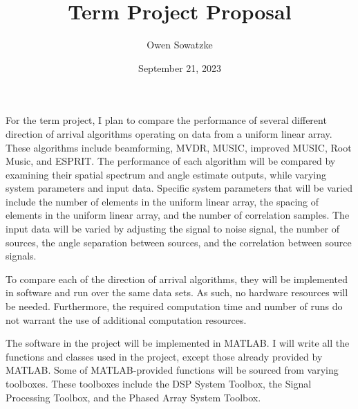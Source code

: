 \documentclass{article}
\title{Term Project Proposal}
\author{Owen Sowatzke}
\date{September 21, 2023}
\begin{document}
	\maketitle

	For the term project, I plan to compare the performance of several different direction of arrival algorithms operating on data from a uniform linear array. These algorithms include beamforming, MVDR, MUSIC, improved MUSIC, Root Music, and ESPRIT. The performance of each algorithm will be compared by examining their spatial spectrum and angle estimate outputs, while varying system parameters and input data. Specific system parameters that will be varied include the number of elements in the uniform linear array, the spacing of elements in the uniform linear array, and the number of correlation samples. The input data will be varied by adjusting the signal to noise signal, the number of sources, the angle separation between sources, and the correlation between source signals.
	
	To compare each of the direction of arrival algorithms, they will be implemented in software and run over the same data sets. As such, no hardware resources will be needed. Furthermore, the required computation time and number of runs do not warrant the use of additional computation resources. 
	
	
	The software in the project will be implemented in MATLAB. I will write all the functions and classes used in the project, except those already provided by MATLAB. Some of MATLAB-provided functions will be sourced from varying toolboxes. These toolboxes include the DSP System Toolbox, the Signal Processing Toolbox, and the Phased Array System Toolbox.
	
	
	
	
\end{document}
